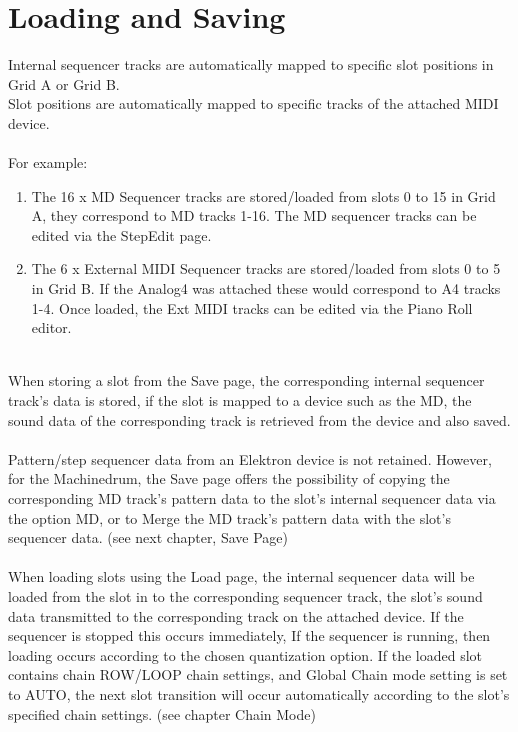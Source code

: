 \chapter{Loading and Saving}
Internal sequencer tracks are automatically mapped to specific slot positions in Grid A or Grid B.\\Slot positions are automatically mapped to specific tracks of the attached MIDI device. \\\\For example:
\begin{enumerate}
    \item The 16 x MD Sequencer tracks are stored/loaded from slots 0 to 15 in Grid A, they correspond to MD tracks 1-16. The MD sequencer tracks can be edited via the StepEdit page.
    \item The 6 x External MIDI Sequencer tracks are stored/loaded from slots 0 to 5 in Grid B. If the Analog4 was attached these would correspond to A4 tracks 1-4. Once loaded, the Ext MIDI tracks can be edited via the Piano Roll editor.
\end{enumerate}
\\
When storing a slot from the Save page, the corresponding internal sequencer track's data is stored, if the slot is mapped to a device such as the MD, the sound data of the corresponding track is retrieved from the device and also saved.\\
\\
Pattern/step sequencer data from an Elektron device is not retained. However, for the Machinedrum, the Save page offers the possibility of copying the corresponding MD track's pattern data to the slot's internal sequencer data via the option MD, or to Merge the MD track's pattern data with the slot's sequencer data. (see next chapter, Save Page)
\\\\
When loading slots using the Load page, the internal sequencer data will be loaded from the slot in to the corresponding sequencer track, the slot's sound data transmitted to the corresponding track on the attached device. If the sequencer is stopped this occurs immediately, If the sequencer is running, then loading occurs according to the chosen quantization option. If the loaded slot contains chain ROW/LOOP chain settings, and Global Chain mode setting is set to AUTO, the next slot transition will occur automatically according to the slot's specified chain settings. (see chapter Chain Mode)


